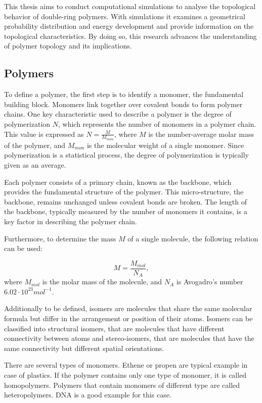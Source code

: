 \documentclass{article}      %
\begin{document}
This thesis aims to conduct computational simulations to analyse the topological behavior of double-ring polymers. With simulations it examines a geometrical probability distribution and energy development and provide information on the topological characteristics. By doing so, this research advances the understanding of polymer topology and its implications.

\newpage
  
\subsection{Polymers} 

To define a polymer, the first step is to identify a monomer, the fundamental building block. Monomers link together over covalent bonds to form polymer chains. One key characteristic used to describe a polymer is the degree of polymerization $N$, which represents the number of monomers in a polymer chain. This value is expressed as $N = \frac{M}{M_{mon}}$, where $M$ is the number-average molar mass of the polymer, and $M_{mon}$ is the molecular weight of a single monomer. Since polymerization is a statistical process, the degree of polymerization is typically given as an average.

Each polymer consists of a primary chain, known as the backbone, which provides the fundamental structure of the polymer. This micro-structure, the backbone, remains unchanged unless covalent bonds are broken. The length of the backbone, typically measured by the number of monomers it contains, is a key factor in describing the polymer chain.

Furthermore, to determine the mass $M$ of a single molecule, the following relation can be used:

\[
M = \frac{M_{mol}}{N_A},
\]
where $M_{mol}$ is the molar mass of the molecule, and $N_A$ is Avogadro's number $6.02 \cdot 10^{23} mol^{-1}$.

Additionally to be defined, isomers are molecules that share the same molecular formula but differ in the arrangement or position of their atoms. Isomers can be classified into structural isomers, that are molecules that have different connectivity between atoms and stereo-isomers, that are molecules that have the same connectivity but different spatial orientations.

There are several types of monomers. Ethene or propen are typical example in case of plastics. If the polymer contains only one type of monomer, it is called homopolymers. Polymers that contain monomers of different type are called heteropolymers. DNA is a good example for this case.
\end{document}
